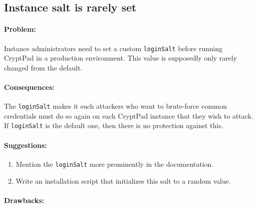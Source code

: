 \subsection{Instance salt is rarely set}

\paragraph{Problem:}
Instance administrators need to set a custom \texttt{loginSalt} before running CryptPad in a production environment.
This value is supposedly only rarely changed from the default.

\paragraph{Consequences:}
The \texttt{loginSalt} makes it such attackers who want to brute-force common credentials must do so again on each CryptPad instance that they wish to attack. If \texttt{loginSalt} is the default one, then there is no protection against this.

\paragraph{Suggestions:}
\begin{enumerate}
  \item Mention the \texttt{loginSalt} more prominently in the documentation.
  \item Write an installation script that initializes this salt to a random value.
\end{enumerate}

\paragraph{Drawbacks:}
